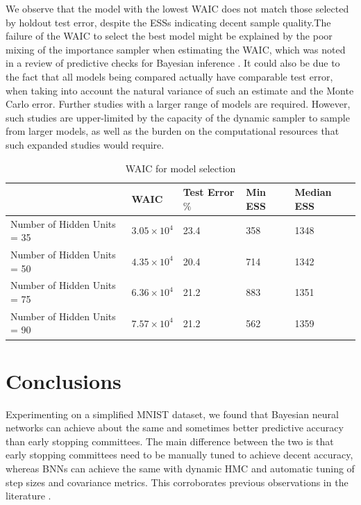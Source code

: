 \documentclass[12pt]{report}
\begin{document}
We observe that the model with the lowest WAIC does not match those selected by holdout test error, despite the ESSs indicating decent sample quality.The failure of the WAIC to select the best model might be explained by the poor mixing of the importance sampler when estimating the WAIC, which was noted in a review of predictive checks for Bayesian inference \cite{vehtari2017practical}. It could also be due to the fact that all models being compared actually have comparable test error, when taking into account the natural variance of such an estimate and the Monte Carlo error. Further studies with a larger range of models are required. However, such studies are upper-limited by the capacity of the dynamic sampler to sample from larger models, as well as the burden on the computational resources that such expanded studies would require.


\begin{table}[]
\centering
\begin{tabular}{@{}lllll@{}}
\toprule
               & WAIC & Test Error$\%$ & Min ESS & Median ESS      \\ \midrule
Number of Hidden Units = 35    & $3.05 \times 10^4$  & 23.4    & 358 & 1348   \\ \midrule
Number of Hidden Units = 50  & $4.35 \times 10^4$   & 20.4  & 714  & 1342                \\ \midrule
Number of Hidden Units = 75 &$ 6.36 \times 10^4$   & 21.2  & 883  & 1351                 \\ \midrule
Number of Hidden Units = 90 &$ 7.57 \times 10^4$  & 21.2   & 562  & 1359                 \\ \bottomrule
\end{tabular}
\caption{WAIC for model selection}
\label{my-label}
\end{table}


\section{Conclusions}

Experimenting on a simplified MNIST dataset, we found that Bayesian neural networks can achieve about the same and sometimes better predictive accuracy than early stopping committees. The main difference between the two is that early stopping committees need to be manually  tuned to achieve decent accuracy, whereas BNNs can achieve the same with dynamic HMC and automatic tuning of step sizes and covariance metrics. This corroborates previous observations in the literature \cite{neal2012bayesian}. 
\end{document}
